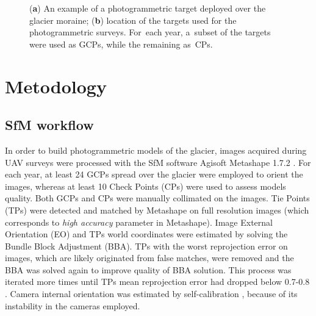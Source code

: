\begin{figure}
    \centering
    \caption{(\textbf{a}) An example of a photogrammetric target deployed over the
        glacier moraine; (\textbf{b}) location of the targets used for the
        photogrammetric
        surveys. For~each year, a~subset of the targets were used as GCPs, while the
        remaining
        as~CPs.}
    \label{fig:belvedereGCP}
\end{figure}

\section{Metodology}

\subsection{SfM workflow}

In order to build photogrammetric models of the glacier, images acquired during UAV
surveys were processed with the SfM software Agisoft Metashape 1.7.2 \citep{agisoft}.
For each year, at least 24 GCPs spread over the glacier were employed to orient the
images, whereas at least 10 Check Points (CPs) were used to assess models quality.
Both GCPs and CPs were manually collimated on the images.
Tie Points (TPs) were detected and matched by Metashape on full resolution images (which
corresponds to \textit{high accuracy} parameter in Metashape).
Image External Orientation (EO) and TPs world coordinates were estimated by solving the
Bundle Block Adjustment (BBA).
TPs with the worst reprojection error on images, which are likely originated from false
matches, were removed and the BBA was solved again to improve quality of BBA solution.
This process was iterated more times until TPs mean reprojection error had dropped below
0.7-0.8 \unit{\pixel}.
Camera internal orientation was estimated by self-calibration
\citep{Fraser2013,Cramer2017}, because of its instability in the cameras employed.

